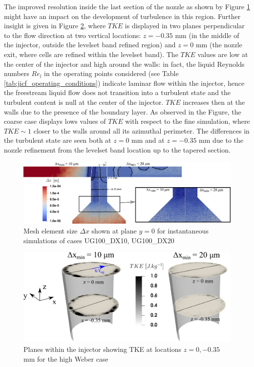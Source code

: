The improved resolution inside the last section of the nozzle as shown by Figure \ref{fig:jicf_injector_resolution_with_mesh} might have an impact on the development of turbulence in this region. Further insight is given in Figure \ref{fig:jicf_nozzle_y_plus_PDF}, where $TKE$ is displayed in two planes perpendicular to the flow direction at two vertical locations: $z = -0.35$ mm (in the middle of the injector, outside the levelset band refined region) and $z = 0$ mm (the nozzle exit, where cells are refined within the levelset band). The $TKE$ values are low at the center of the injector and high around the walls: in fact, the liquid Reynolds numbers $Re_l$ in the operating points considered (see Table \ref{tab:jicf_operating_conditions}) indicate laminar flow within the injector, hence the freestream liquid flow does not transition into a turbulent state and the turbulent content is null at the center of the injector. $TKE$ increases then at the walls due to the presence of the boundary layer. As observed in the Figure, the coarse case displays lows values of $TKE$ with respect to the fine simulation, where $TKE \sim 1$ closer to the walls around all its azimuthal perimeter. The differences in the turbulent state are seen both at $z = 0$ mm and at $z = -0.35$ mm due to the nozzle refinement from the levelset band location up to the tapered section.

\clearpage

\begin{figure}[ht]
	\centering
   \includegraphics[scale=0.28]{./part2_developments/figures_ch5_resolved_JICF/instabilities_resolution/injector_resolution_with_mesh}
   \caption{Mesh element size $\Delta x$ shown at plane $y = 0$ for instantaneous simulations of cases UG100\_DX10, UG100\_DX20}
   \label{fig:jicf_injector_resolution_with_mesh}
\end{figure}

\begin{figure}[ht]
	\centering
   \includegraphics[scale=0.5]{./part2_developments/figures_ch5_resolved_JICF/instabilities_resolution/injector_visualization_disks}
   \caption{Planes within the injector showing TKE at locations $z = 0, -0.35$ mm for the high Weber case}
   \label{fig:jicf_nozzle_y_plus_PDF}
\end{figure}



